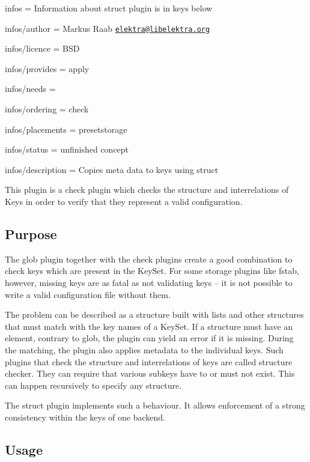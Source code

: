 
\begin{DoxyItemize}
\item infos = Information about struct plugin is in keys below
\item infos/author = Markus Raab \href{mailto:elektra@libelektra.org}{\tt elektra@libelektra.\+org}
\item infos/licence = B\+S\+D
\item infos/provides = apply
\item infos/needs =
\item infos/ordering = check
\item infos/placements = presetstorage
\item infos/status = unfinished concept
\item infos/description = Copies meta data to keys using struct
\end{DoxyItemize}

This plugin is a check plugin which checks the structure and interrelations of Keys in order to verify that they represent a valid configuration.

\subsection*{Purpose}

The glob plugin together with the check plugins create a good combination to check keys which are present in the Key\+Set. For some storage plugins like fstab, however, missing keys are as fatal as not validating keys – it is not possible to write a valid configuration file without them.

The problem can be described as a structure built with lists and other structures that must match with the key names of a Key\+Set. If a structure must have an element, contrary to glob, the plugin can yield an error if it is missing. During the matching, the plugin also applies metadata to the individual keys. Such plugins that check the structure and interrelations of keys are called structure checker. They can require that various subkeys have to or must not exist. This can happen recursively to specify any structure.

The struct plugin implements such a behaviour. It allows enforcement of a strong consistency within the keys of one backend.

\subsection*{Usage}

